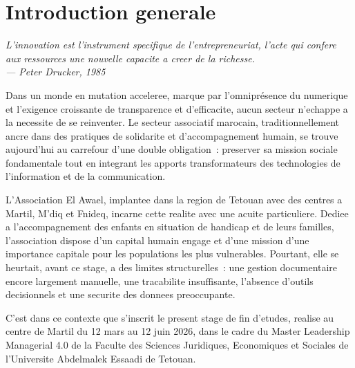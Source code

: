 \documentclass[12pt,a4paper,openany]{report}
\begin{document}
\cleardoublepage
{}
\setcounter{page}{1}

\chapter*{Introduction generale}

\begin{boitecitation}
\itshape
\og{}L'innovation est l'instrument specifique de l'entrepreneuriat,
l'acte qui confere aux ressources une nouvelle capacite a creer de la
richesse.\fg{}\\
\raggedleft --- Peter Drucker, 1985
\end{boitecitation}

\vspace{0.5cm}
Dans un monde en mutation acceleree, marque par l'omniprésence du
numerique et l'exigence croissante de transparence et d'efficacite,
aucun secteur n'echappe a la necessite de se reinventer. Le secteur
associatif marocain, traditionnellement ancre dans des pratiques de
solidarite et d'accompagnement humain, se trouve aujourd'hui au
carrefour d'une double obligation~: preserver sa mission sociale
fondamentale tout en integrant les apports transformateurs des
technologies de l'information et de la communication.

\vspace{0.3cm}
L'Association El Awael, implantee dans la region de Tetouan avec des
centres a Martil, M'diq et Fnideq, incarne cette realite avec une
acuite particuliere. Dediee a l'accompagnement des enfants en situation
de handicap et de leurs familles, l'association dispose d'un capital
humain engage et d'une mission d'une importance capitale pour les
populations les plus vulnerables. Pourtant, elle se heurtait, avant ce
stage, a des limites structurelles~: une gestion documentaire encore
largement manuelle, une tracabilite insuffisante, l'absence d'outils
decisionnels et une securite des donnees preoccupante.

\vspace{0.3cm}
C'est dans ce contexte que s'inscrit le present stage de fin d'etudes,
realise au centre de Martil du 12 mars au 12 juin 2026, dans le cadre
du Master Leadership Managerial 4.0 de la Faculte des Sciences
Juridiques, Economiques et Sociales de l'Universite Abdelmalek Essaadi
de Tetouan.
\end{document}
